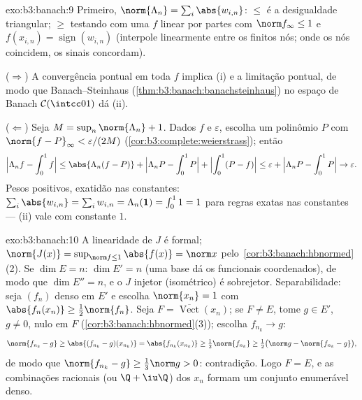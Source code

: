 \begin{solution}{exo:b3:banach:9}
Primeiro, $\norm{\Lambda_n} = \sum_i\abs{w_{i,n}}$: $\leq$ é a
desigualdade triangular; $\geq$ testando com uma $f$ linear por partes
com $\norm f_\infty \leq 1$ e $f(x_{i,n}) =
\operatorname{sign}(w_{i,n})$ (interpole linearmente entre os
finitos nós; onde os nós coincidem, os sinais concordam).

($\Rightarrow$) A convergência pontual em toda $f$ implica (i)
e a limitação pontual, de modo que Banach--Steinhaus
(\cref{thm:b3:banach:banachsteinhaus}) no espaço de Banach $\mathcal
C(\intcc01)$ dá (ii).

($\Leftarrow$) Seja $M = \sup_n\norm{\Lambda_n} + 1$. Dados $f$
e $\varepsilon$, escolha um polinômio $P$ com $\norm{f -
P}_\infty < \varepsilon/(2M)$
(\cref{cor:b3:complete:weierstrass}); então
\[
\Bigl|\Lambda_n f - \int_0^1 f\Bigr|
\leq \abs{\Lambda_n(f - P)} + \Bigl|\Lambda_nP -
\int_0^1P\Bigr| + \Bigl|\int_0^1(P - f)\Bigr|
\leq \varepsilon + \Bigl|\Lambda_nP - \int_0^1P\Bigr| \to
\varepsilon .
\]
Pesos positivos, exatidão nas constantes: $\sum_i\abs{w_{i,n}}
= \sum_iw_{i,n} = \Lambda_n(\mathbf 1) = \int_0^1 1 = 1$ para
regras exatas nas constantes --- (ii) vale com constante $1$.
\end{solution}

\begin{solution}{exo:b3:banach:10}
A linearidade de $J$ é formal; $\norm{J(x)} = \sup_{\norm f \leq
1}\abs{f(x)} = \norm x$ pelo~\cref{cor:b3:banach:hbnormed}(2). Se $\dim E = n$: $\dim E' =
n$ (uma base dá os funcionais coordenados), de modo que $\dim E'' = n$,
e o $J$ injetor (isométrico) é sobrejetor. Separabilidade: seja
$(f_n)$ denso em $E'$ e escolha $\norm{x_n} = 1$ com
$\abs{f_n(x_n)} \geq \frac12\norm{f_n}$. Seja $F =
\overline{\operatorname{Vect}}(x_n)$; se $F \neq E$, tome $g
\in E'$, $g \neq 0$, nulo em $F$
(\cref{cor:b3:banach:hbnormed}(3)); escolha $f_{n_k} \to g$:
\[
\norm{f_{n_k} - g} \geq \abs{(f_{n_k} - g)(x_{n_k})}
= \abs{f_{n_k}(x_{n_k})} \geq \tfrac12\norm{f_{n_k}}
\geq \tfrac12\bigl(\norm g - \norm{f_{n_k} - g}\bigr),
\]
de modo que $\norm{f_{n_k} - g} \geq \frac13\norm g > 0$: contradição.
Logo $F = E$, e as combinações racionais (ou $\Q + \iu\Q$) dos
$x_n$ formam um conjunto enumerável denso.
\end{solution}

